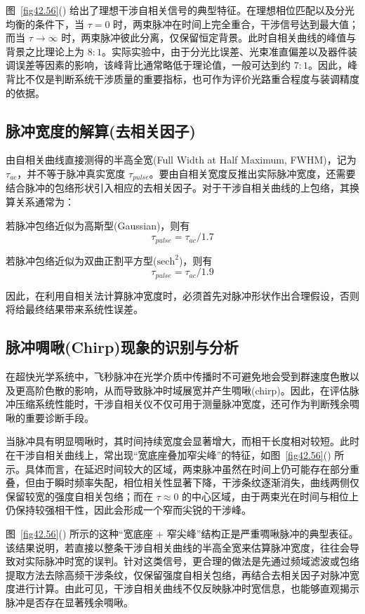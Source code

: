 图~\ref{fig42.56}() 给出了理想干涉自相关信号的典型特征。在理想相位匹配以及分光均衡的条件下，当 $\tau=0$ 时，两束脉冲在时间上完全重合，干涉信号达到最大值；而当 $\tau \rightarrow \infty$ 时，两束脉冲彼此分离，仅保留恒定背景。此时自相关曲线的峰值与背景之比理论上为 $8:1$。实际实验中，由于分光比误差、光束准直偏差以及器件装调误差等因素的影响，该峰背比通常略低于理论值，一般可达到约 $7:1$。因此，峰背比不仅是判断系统干涉质量的重要指标，也可作为评价光路重合程度与装调精度的依据。

\subsection{脉冲宽度的解算(去相关因子)}\label{6.1.2}

由自相关曲线直接测得的半高全宽(Full Width at Half Maximum, FWHM)，记为 $\tau_{ac}$，并不等于脉冲真实宽度 $\tau_{pulse}$。要由自相关宽度反推出实际脉冲宽度，还需要结合脉冲的包络形状引入相应的去相关因子。对于干涉自相关曲线的上包络，其换算关系通常为：

若脉冲包络近似为高斯型(Gaussian)，则有
\[
\tau_{pulse}=\tau_{ac}/1.7
\]

若脉冲包络近似为双曲正割平方型($\mathrm{sech}^2$)，则有
\[
\tau_{pulse}=\tau_{ac}/1.9
\]

因此，在利用自相关法计算脉冲宽度时，必须首先对脉冲形状作出合理假设，否则将给最终结果带来系统性误差。

\subsection{脉冲啁啾(Chirp)现象的识别与分析}\label{6.1.3}

在超快光学系统中，飞秒脉冲在光学介质中传播时不可避免地会受到群速度色散以及更高阶色散的影响，从而导致脉冲时域展宽并产生啁啾(chirp)。因此，在评估脉冲压缩系统性能时，干涉自相关仪不仅可用于测量脉冲宽度，还可作为判断残余啁啾的重要诊断手段。

当脉冲具有明显啁啾时，其时间持续宽度会显著增大，而相干长度相对较短。此时在干涉自相关曲线上，常出现``宽底座叠加窄尖峰''的特征，如图~\ref{fig42.56}() 所示。具体而言，在延迟时间较大的区域，两束脉冲虽然在时间上仍可能存在部分重叠，但由于瞬时频率失配，相位相关性显著下降，干涉条纹逐渐消失，曲线两侧仅保留较宽的强度自相关包络；而在 $\tau \approx 0$ 的中心区域，由于两束光在时间与相位上仍保持较强相干性，因此会形成一个窄而尖锐的干涉峰。

图~\ref{fig42.56}() 所示的这种``宽底座 $+$ 窄尖峰''结构正是严重啁啾脉冲的典型表征。该结果说明，若直接以整条干涉自相关曲线的半高全宽来估算脉冲宽度，往往会导致对实际脉冲时宽的误判。针对这类信号，更合理的做法是先通过频域滤波或包络提取方法去除高频干涉条纹，仅保留强度自相关包络，再结合去相关因子对脉冲宽度进行计算。由此可见，干涉自相关曲线不仅反映脉冲时宽信息，也能够直观揭示脉冲是否存在显著残余啁啾。

